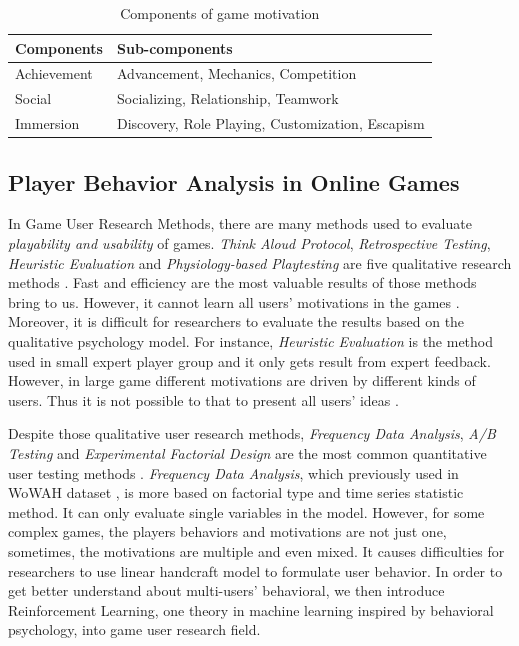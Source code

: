 \documentclass{sigchi}
\begin{document}
\begin{table}
\caption{Components of game motivation}
\begin{tabularx}{\textwidth}{lX}
    Components & Sub-components \\
    \midrule
    Achievement & Advancement, Mechanics, Competition \\
    Social & Socializing, Relationship, Teamwork \\
    Immersion & Discovery, Role Playing, Customization, Escapism
    \label{tbl:components}
\end{tabularx}
\end{table}

\subsection{Player Behavior Analysis in Online Games}

In Game User Research Methods, there are many methods used to evaluate \textit{playability and usability} of games. \textit{Think Aloud Protocol}, \textit{Retrospective Testing}, \textit{Heuristic Evaluation} and \textit{Physiology-based Playtesting} are five qualitative research methods \cite{desurvire2013methods}. Fast and efficiency are the most valuable results of those methods bring to us. However, it cannot learn all users' motivations in the games \cite{kivikangas2011review}. Moreover, it is difficult for researchers to evaluate the results based on the qualitative psychology model. For instance, \textit{Heuristic Evaluation} is the method used in small expert player group and it only gets result from expert feedback. However, in large game different motivations are driven by different kinds of users. Thus it is not possible to that to present all users' ideas \cite{desurvire2013methods}.

Despite those qualitative user research methods, \textit{Frequency Data Analysis}, \textit{A/B Testing} and \textit{Experimental Factorial Design} are the most common quantitative user testing methods \cite{el2013game}.  \textit{Frequency Data Analysis}, which previously used in WoWAH dataset \cite{Bell2013a}, is more based on factorial type and time series statistic method. It can only evaluate single variables in the model. However, for some complex games, the players behaviors and motivations are not just one, sometimes, the motivations are multiple and even mixed. It causes difficulties for researchers to use linear handcraft model to formulate user behavior. In order to get better understand about multi-users' behavioral, we then introduce Reinforcement Learning, one theory in machine learning inspired by behavioral psychology, into game user research field.
\end{document}
